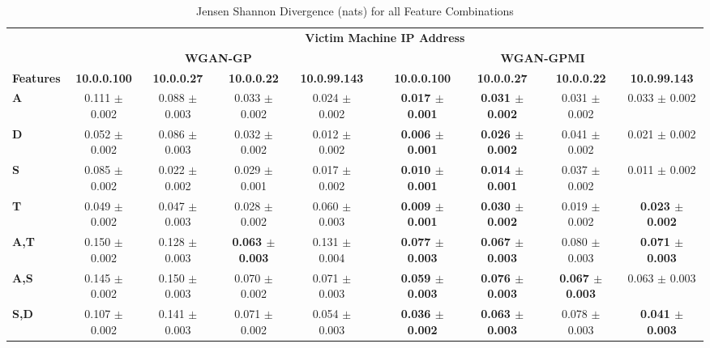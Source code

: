 \begin{table}[!htbp]
	\caption{Jensen Shannon Divergence (nats) for all Feature Combinations}
	\label{tab:jsd}
	\centering
	\small
	\begin{adjustbox}{angle=90}
		\begin{tabular}{l|c|c|c|c|c|c|c|c|c|}
			\multicolumn{1}{c|}{} & \multicolumn{9}{c|}{\textbf{Victim Machine IP Address}} \\
			\multicolumn{1}{c|}{} & \multicolumn{4}{c|}{\textbf{WGAN-GP}} &  & \multicolumn{4}{c|}{\textbf{WGAN-GPMI}} \\
			\multicolumn{1}{c|}{\textbf{Features}} & \textbf{10.0.0.100} & \textbf{10.0.0.27} & \textbf{10.0.0.22} & \textbf{10.0.99.143} & \textbf{} & \textbf{10.0.0.100} & \textbf{10.0.0.27} & \textbf{10.0.0.22} & \textbf{10.0.99.143} \\ \hline
			\textbf{A} & 0.111 $\pm$ 0.002& 0.088 $\pm$ 0.003 & 0.033 $\pm$ 0.002 & 0.024 $\pm$ 0.002 &  & \textbf{0.017 $\pm$ 0.001} & \textbf{0.031 $\pm$ 0.002} & 0.031  $\pm$ 0.002 & 0.033 $\pm$ 0.002 \\
			\textbf{D} & 0.052 $\pm$ 0.002& 0.086 $\pm$ 0.003 & 0.032 $\pm$ 0.002 & 0.012 $\pm$ 0.002 &  & \textbf{0.006 $\pm$ 0.001} & \textbf{0.026 $\pm$ 0.002} & 0.041  $\pm$ 0.002 & 0.021 $\pm$ 0.002 \\
			\textbf{S} & 0.085 $\pm$ 0.002& 0.022 $\pm$ 0.002 & 0.029 $\pm$ 0.001 & 0.017 $\pm$ 0.002 &  & \textbf{0.010 $\pm$ 0.001} & \textbf{0.014 $\pm$ 0.001} & 0.037  $\pm$ 0.002 & 0.011 $\pm$ 0.002 \\
			\textbf{T} & 0.049 $\pm$ 0.002& 0.047 $\pm$ 0.003 & 0.028 $\pm$ 0.002 & 0.060 $\pm$ 0.003 &  & \textbf{0.009 $\pm$ 0.001} & \textbf{0.030 $\pm$ 0.002} & 0.019  $\pm$ 0.002 & \textbf{0.023 $\pm$ 0.002} \\ \hline
			\textbf{A,T} & 0.150 $\pm$ 0.002 & 0.128 $\pm$ 0.003 & \textbf{0.063 $\pm$ 0.003} & 0.131 $\pm$ 0.004 &  & \textbf{0.077 $\pm$ 0.003} & \textbf{0.067 $\pm$ 0.003} & 0.080 $\pm$ 0.003 & \textbf{0.071 $\pm$ 0.003} \\
			\textbf{A,S} & 0.145 $\pm$ 0.002 & 0.150 $\pm$ 0.003 & 0.070 $\pm$ 0.002 & 0.071 $\pm$ 0.003 &  & \textbf{0.059 $\pm$ 0.003} & \textbf{0.076 $\pm$ 0.003} & \textbf{0.067 $\pm$ 0.003 } & 0.063 $\pm$ 0.003 \\
			\textbf{S,D} & 0.107 $\pm$ 0.002 & 0.141 $\pm$ 0.003 & 0.071 $\pm$ 0.002 & 0.054 $\pm$ 0.003 &  & \textbf{0.036 $\pm$ 0.002} & \textbf{0.063 $\pm$ 0.003} & 0.078  $\pm$ 0.003 & \textbf{0.041 $\pm$ 0.003} \\

\end{tabular}
\end{adjustbox}
\end{table}
